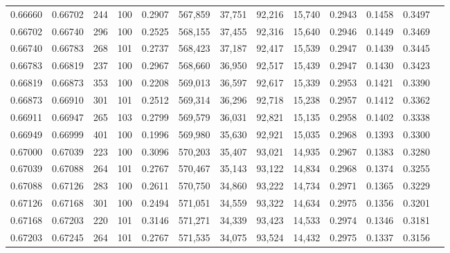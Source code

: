 \begin{tabular}{rrrrrrrrrrrrr}
0.66660 & 0.66702 &   244 & 100 &                                     0.2907 & 567,859 &  37,751 &  92,216 &  15,740 & 0.2943 & 0.1458 & 0.3497 \\
0.66702 & 0.66740 &   296 & 100 &                                     0.2525 & 568,155 &  37,455 &  92,316 &  15,640 & 0.2946 & 0.1449 & 0.3469 \\
0.66740 & 0.66783 &   268 & 101 &                                     0.2737 & 568,423 &  37,187 &  92,417 &  15,539 & 0.2947 & 0.1439 & 0.3445 \\
0.66783 & 0.66819 &   237 & 100 &                                     0.2967 & 568,660 &  36,950 &  92,517 &  15,439 & 0.2947 & 0.1430 & 0.3423 \\
0.66819 & 0.66873 &   353 & 100 &                                     0.2208 & 569,013 &  36,597 &  92,617 &  15,339 & 0.2953 & 0.1421 & 0.3390 \\
0.66873 & 0.66910 &   301 & 101 &                                     0.2512 & 569,314 &  36,296 &  92,718 &  15,238 & 0.2957 & 0.1412 & 0.3362 \\
0.66911 & 0.66947 &   265 & 103 &                                     0.2799 & 569,579 &  36,031 &  92,821 &  15,135 & 0.2958 & 0.1402 & 0.3338 \\
0.66949 & 0.66999 &   401 & 100 &                                     0.1996 & 569,980 &  35,630 &  92,921 &  15,035 & 0.2968 & 0.1393 & 0.3300 \\
0.67000 & 0.67039 &   223 & 100 &                                     0.3096 & 570,203 &  35,407 &  93,021 &  14,935 & 0.2967 & 0.1383 & 0.3280 \\
0.67039 & 0.67088 &   264 & 101 &                                     0.2767 & 570,467 &  35,143 &  93,122 &  14,834 & 0.2968 & 0.1374 & 0.3255 \\
0.67088 & 0.67126 &   283 & 100 &                                     0.2611 & 570,750 &  34,860 &  93,222 &  14,734 & 0.2971 & 0.1365 & 0.3229 \\
0.67126 & 0.67168 &   301 & 100 &                                     0.2494 & 571,051 &  34,559 &  93,322 &  14,634 & 0.2975 & 0.1356 & 0.3201 \\
0.67168 & 0.67203 &   220 & 101 &                                     0.3146 & 571,271 &  34,339 &  93,423 &  14,533 & 0.2974 & 0.1346 & 0.3181 \\
0.67203 & 0.67245 &   264 & 101 &                                     0.2767 & 571,535 &  34,075 &  93,524 &  14,432 & 0.2975 & 0.1337 & 0.3156 \\

\end{tabular}
